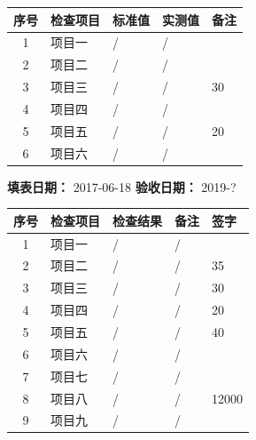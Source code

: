 \documentclass[UTF8,10pt,a4paper,fontset=fandol]{ctexart}
\newcommand{\fieldvalue}[1]{#1}
\newcommand{\handwritten}[1]{#1}
\begin{document}
\vspace{0.5em}

\begin{tabularx}{\textwidth}{|c|X|X|X|X|}
\hline
\textbf{序号} & \textbf{检查项目} & \textbf{标准值} & \textbf{实测值} & \textbf{备注} \\
\hline
1 & 项目一 & / & / & \\
\hline
2 & 项目二 & / & / & \\
\hline
3 & 项目三 & / & / &
\fieldvalue{\handwritten{30}} \\
\hline
4 & 项目四 & / & / & \\
\hline
5 & 项目五 & / & / &
\fieldvalue{\handwritten{20}} \\
\hline
6 & 项目六 & / & / & \\
\hline
\end{tabularx}

\vspace{1em}

\noindent
\textbf{填表日期：}
\fieldvalue{\handwritten{2017-06-18}}
\hfill
\textbf{验收日期：}
\fieldvalue{\handwritten{2019-?}}

\begin{tabularx}{\textwidth}{|c|X|X|X|X|}
\hline
\textbf{序号} & \textbf{检查项目} & \textbf{检查结果} & \textbf{备注} & \textbf{签字} \\
\hline
1 & 项目一 & / & / & \\
\hline
2 & 项目二 & / & / &
\fieldvalue{\handwritten{35}} \\
\hline
3 & 项目三 & / & / &
\fieldvalue{\handwritten{30}} \\
\hline
4 & 项目四 & / & / &
\fieldvalue{\handwritten{20}} \\
\hline
5 & 项目五 & / & / &
\fieldvalue{\handwritten{40}} \\
\hline
6 & 项目六 & / & / & \\
\hline
7 & 项目七 & / & / & \\
\hline
8 & 项目八 & / & / &
\fieldvalue{\handwritten{12000}} \\
\hline
9 & 项目九 & / & / & \\
\hline
\end{tabularx}
\end{document}
